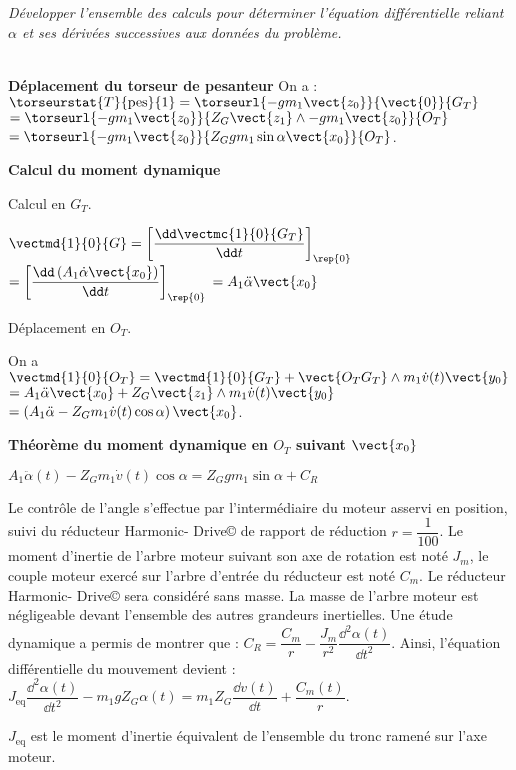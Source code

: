 \begin{multicols}{2}
\subparagraph{} \textit{Développer l'ensemble des calculs pour déterminer l'équation différentielle reliant $\alpha$ et ses dérivées
successives aux données du problème.}
\ifprof
\begin{corrige} ~\\

\textbf{Déplacement du torseur de pesanteur}
On a : $\torseurstat{T}{\text{pes}}{1} = \torseurl{-gm_1\vect{z_0}}{\vect{0}}{G_T}$ 
$= \torseurl{-gm_1\vect{z_0}}{Z_G \vect{z_1}\wedge -gm_1\vect{z_0}}{O_T}$
$= \torseurl{-gm_1\vect{z_0}}{Z_G gm_1\sin\alpha \vect{x_0}}{O_T}$.


\textbf{Calcul du moment dynamique} 

Calcul en $G_T$. 

$\vectmd{1}{0}{G} = \left[\dfrac{\dd \vectmc{1}{0}{G_T}}{\dd t}\right]_{\rep{0}}$ $=\left[\dfrac{\dd \left( A_1 \dot{\alpha}\vect{x_0}\right)}{\dd t}\right]_{\rep{0}}$
$= A_1 \ddot{\alpha}\vect{x_0}$

Déplacement en $O_T$. 

On a $\vectmd{1}{0}{O_T} = \vectmd{1}{0}{G_T} + \vect{O_T G_T}\wedge m_1 \dot{v}(t) \vect{y_0}$
$= A_1 \ddot{\alpha}\vect{x_0} + Z_G \vect{z_1} \wedge m_1 \dot{v}(t) \vect{y_0}$
$= \left(A_1 \ddot{\alpha} - Z_G   m_1 \dot{v}(t) \cos \alpha \right)\vect{x_0} $.


\textbf{Théorème du moment dynamique en $O_T$ suivant $\vect{x_0}$}

$A_1 \ddot{\alpha}(t) - Z_G   m_1 \dot{v}(t) \cos \alpha = Z_G gm_1\sin\alpha  +C_R $


\end{corrige}
\else
\fi


Le contrôle de l'angle s'effectue par l'intermédiaire du moteur asservi en position, suivi du réducteur Harmonic-
Drive© de rapport de réduction $r= \dfrac{1}{100}$. Le moment d'inertie de l'arbre moteur suivant son axe de rotation est
noté $J_m$, le couple moteur exercé sur l'arbre d'entrée du réducteur est noté $C_m$. Le réducteur Harmonic-
Drive© sera considéré sans masse. La masse de l'arbre moteur est négligeable devant l'ensemble des autres
grandeurs inertielles. Une étude dynamique a permis de montrer que : $C_R=\dfrac{C_m}{r}-\dfrac{J_m}{r^2}\dfrac{\dd^2\alpha(t)}{\dd t^2}$. Ainsi, l'équation
différentielle du mouvement devient : 
$J_{\text{eq}} \dfrac{\dd^2\alpha(t)}{\dd t^2} -m_1gZ_G\alpha(t)=m_1 Z_G \dfrac{\dd v(t)}{\dd t}+\dfrac{C_m(t)}{r}$.

$J_{\text{eq}}$ est le moment d'inertie équivalent de l'ensemble du tronc ramené sur l'axe moteur.



\end{multicols}
